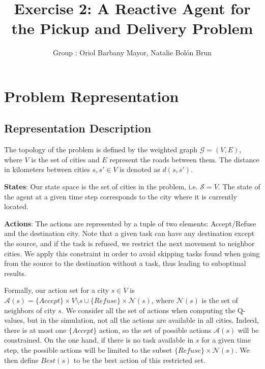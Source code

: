 \documentclass[11pt]{article}
\title{\bf Exercise 2: A Reactive Agent for the Pickup and Delivery Problem}
\author{Group \textnumero 54: Oriol Barbany Mayor, Natalie Bolón Brun}
\begin{document}
\maketitle

\section{Problem Representation}

\subsection{Representation Description}
The topology of the problem is defined by the weighted graph $\mathcal{G}=(V,E)$, where $V$ is the set of cities and $E$ represent the roads between them. The distance in kilometers between cities $s,s' \in V$ is denoted as $d(s,s')$.

 
\textbf{States}: Our state space is the set of cities in the problem, i.e. $\mathcal{S} = V$. The state of the agent at a given time step corresponds to the city where it is currently located.

\textbf{Actions}: The actions are represented by a tuple of two elements: Accept/Refuse and the destination city. Note that a given task can have any destination except the source, and if the task is refused, we restrict the next movement to neighbor cities. We apply this constraint in order to avoid skipping tasks found when going from the source to the destination without a task, thus leading to suboptimal results.

Formally, our action set for a city $s\in V$ is $\mathcal{A}(s) = \{Accept\} \times V \setminus s \cup \{Refuse\} \times \mathcal{N}(s)$, where $\mathcal{N}(s)$ is the set of neighbors of city $s$. We consider all the set of actions when computing the Q-values, but in the simulation, not all the actions are available in all cities. Indeed, there is at most one $\{Accept\}$ action, so the set of possible actions $\mathcal{A}(s)$ will be constrained. On the one hand, if there is no task available in $s$ for a given time step, the possible actions will be limited to the subset $\{Refuse\} \times \mathcal{N}(s)$. We then define $Best(s)$ to be the best action of this restricted set. 
\end{document}
